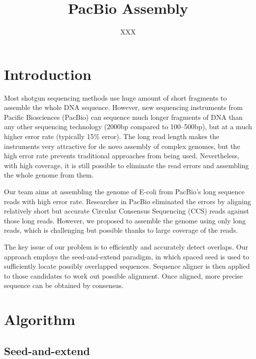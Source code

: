 \documentclass{article}
\title{PacBio Assembly}
\author{XXX}
\begin{document}
\maketitle
\section{Introduction}

Most shotgun sequencing methods use huge amount of short fragments to assemble
the whole DNA sequence. However, new sequencing instruments from Pacific
Biosciences (PacBio) can sequence much longer fragments of DNA than any other
sequencing technology (2000bp compared to 100--500bp), but at a much higher
error rate (typically 15\% error). The long read length makes the instruments
very attractive for de novo assembly of complex genomes, but the high error rate
prevents traditional approaches from being used. Nevertheless, with high
coverage, it is still possible to eliminate the read errors and assembling the
whole genome from them.

Our team aims at assembling the genome of E-coli from PacBio's long sequence
reads with high error rate. Researcher in PacBio eliminated the errors by
aligning relatively short but accurate Circular Consensus Sequencing (CCS) reads
against those long reads. However, we proposed to assemble the genome using only
long reads, which is challenging but possible thanks to large coverage of the
reads.

The key issue of our problem is to efficiently and accurately detect
overlaps. Our approach employs the seed-and-extend paradigm, in which
spaced seed is used to sufficiently locate possibly overlapped
sequences. Sequence aligner is then applied to those candidates to work
out possible alignment. Once aligned, more precise sequence can be
obtained by consensus.

\section{Algorithm}

\subsection{Seed-and-extend}
\end{document}

